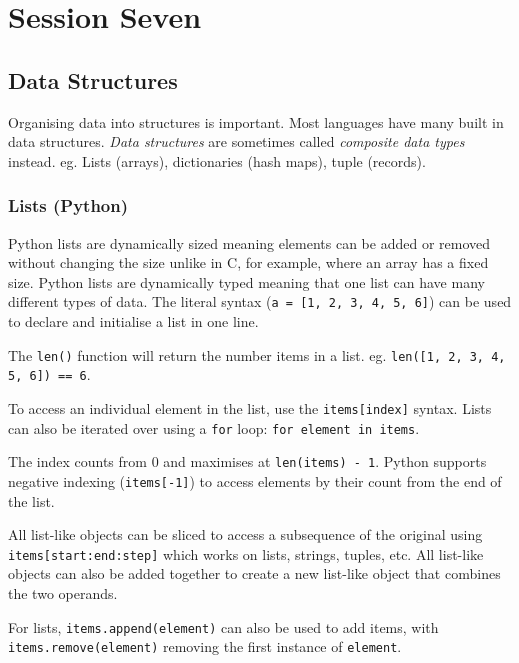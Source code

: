 \section{Session Seven}\label{sec:session_seven}

\subsection{Data Structures}\label{sub:data_structures}

Organising data into structures is important.
Most languages have many built in data structures.
\emph{Data structures} are sometimes called \emph{composite data types} instead.
eg. Lists (arrays), dictionaries (hash maps), tuple (records).

\subsubsection{Lists (Python)}\label{ssub:lists_python_}

Python lists are dynamically sized meaning elements can be added or removed without changing the size unlike in C, for example, where an array has a fixed size.
Python lists are dynamically typed meaning that one list can have many different types of data.
The literal syntax (\texttt{a = [1, 2, 3, 4, 5, 6]}) can be used to declare and initialise a list in one line.

The \texttt{len()} function will return the number items in a list. eg. \texttt{len([1, 2, 3, 4, 5, 6]) == 6}.

To access an individual element in the list, use the \texttt{items[index]} syntax.
Lists can also be iterated over using a \texttt{for} loop: \texttt{for element in items}.

The index counts from \(0\) and maximises at \texttt{len(items) - 1}.
Python supports negative indexing (\texttt{items[-1]}) to access elements by their count from the end of the list.

All list-like objects can be sliced to access a subsequence of the original using \texttt{items[start:end:step]} which works on lists, strings, tuples, etc.
All list-like objects can also be added together to create a new list-like object that combines the two operands.

For lists, \texttt{items.append(element)} can also be used to add items, with \texttt{items.remove(element)} removing the first instance of \texttt{element}.

